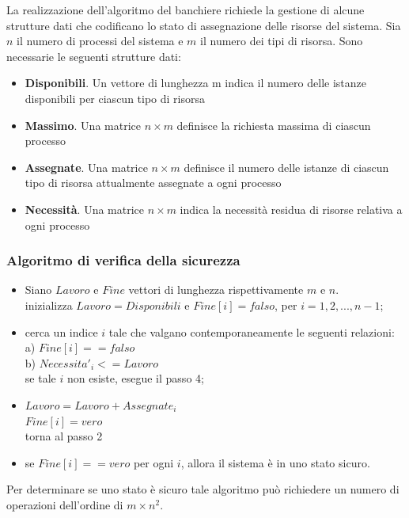\documentclass[11pt,a4paper]{article}
\begin{document}
La realizzazione dell'algoritmo del banchiere richiede la gestione di alcune strutture
dati che codificano lo stato di assegnazione delle risorse del sistema. Sia $n$ il numero di pro­cessi del sistema e $m$ il numero dei tipi di risorsa. Sono necessarie le seguenti strutture dati:
\begin{itemize}
  \item \textbf{Disponibili}. Un vettore di lunghezza m indica il numero delle istanze disponibili per
ciascun tipo di risorsa
  \item \textbf{Massimo}. Una matrice $n\times m$ definisce la richiesta massima di ciascun processo
  \item \textbf{Assegnate}. Una matrice $n\times m$ definisce il numero delle istanze di ciascun tipo di ri­sorsa attualmente assegnate a ogni processo
  \item \textbf{Necessità}. Una matrice $n\times m$ indica la necessità residua di risorse relativa a ogni pro­cesso
\end{itemize}

\subsubsection{Algoritmo di verifica della sicurezza}
\begin{itemize}[leftmargin=*]
  \item Siano $Lavoro$ e $Fine$ vettori di lunghezza rispettivamente $m$ e $n$.\\
  inizializza $Lavoro = Disponibili$ e $Fine[i] = falso$, per $i = 1, 2, ..., n-1$;
  \item cerca un indice $i$ tale che valgano contemporaneamente le seguenti relazioni:\\
  a) $Fine[i] == falso$\\
  b) $Necessita'_i <= Lavoro$\\
  se tale $i$ non esiste, esegue il passo 4;
  \item $Lavoro = Lavoro + Assegnate_i$\\
  $Fine[i] = vero$\\
  torna al passo 2
  \item se $Fine[i] == vero$ per ogni $i$, allora il sistema è in uno stato sicuro.
\end{itemize}
%
Per determinare se uno stato è sicuro tale algoritmo può richiedere un numero di operazio­ni dell'ordine di $m \times n^2$.
\end{document}
